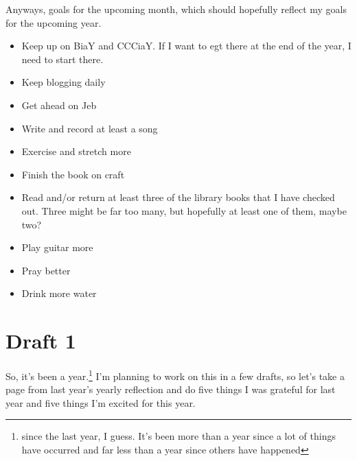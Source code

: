 \documentclass[12pt]{article}[titlepage]
\renewcommand{\,}{\textsuperscript{,}}
\begin{document}
Anyways, goals for the upcoming month, which should hopefully reflect my goals for the upcoming year.

\begin{itemize}
\item Keep up on BiaY and CCCiaY. If I want to egt there at the end of the year, I need to start there.
\item Keep blogging daily
\item Get ahead on Jeb
\item Write and record at least a song
\item Exercise and stretch more
\item Finish the book on craft
\item Read and/or return at least three of the library books that I have checked out. Three might be far too many, but hopefully at least one of them, maybe two?
\item Play guitar more
\item Pray better
\item Drink more water
\end{itemize}
\section{Draft 1}
So, it's been a year.\footnote{since the last year, I guess. It's been more than a year since a lot of things have occurred and far less than a year since others have happened}
I'm planning to work on this in a few drafts, so let's take a page from last year's yearly reflection and do five things I was grateful for last year and five things I'm excited for this year.
\end{document}
